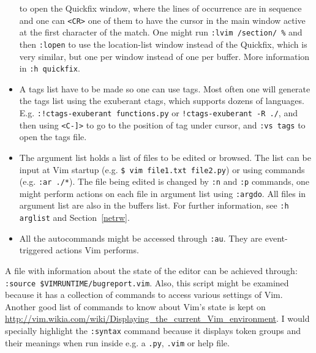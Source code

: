 \documentclass{article}
\newcommand{\ttt}[1] {
	\texttt{<#1>}}
\newcommand{\tttt}[1]{\texttt{#1}}
\begin{document}
\begin{itemize}
		to open the Quickfix window, where the lines of occurrence are in sequence
		and one can \ttt{CR} one of them to have the cursor in the main window active at
		the first character of the match.
		One might run \tttt{:lvim /section/ \%} and then \tttt{:lopen}
		to use the location-list window instead of the Quickfix, which
		is very similar, but one per window instead of one per buffer.
		More information in \tttt{:h quickfix}.
	\item A tags list have to be made so one can use tags.
		Most often one will generate the tags list using the exuberant ctags,
		which supports dozens of languages.
		E.g. \tttt{:!ctags-exuberant functions.py} or \tttt{!ctags-exuberant -R ./},
		and then using \ttt{C-]} to
		go to the position of tag under cursor, and \tttt{:vs tags} to open
		the tags file.
	\item The argument list holds a list of files to be edited or browsed. 
		The list can be input at Vim startup (e.g. \tttt{\$ vim file1.txt file2.py})
	or using commands (e.g. \tttt{:ar ./*}).
		The file being edited is changed by \tttt{:n} and \tttt{:p} commands,
		one might perform actions on each file in argument list using \tttt{:argdo}.
		All files in argument list are also in the buffers list.
    For further information, see \tttt{:h arglist} and Section~\ref{netrw}.
  \item All the autocommands might be accessed through \tttt{:au}.
    They are event-triggered actions Vim performs.
\end{itemize}

A file with information about the state of the editor
can be achieved through: \tttt{:source \$VIMRUNTIME/bugreport.vim}.
Also, this script might be examined because it has
a collection of commands to access various settings of Vim.
Another good list of commands to know about Vim's state is kept on
\url{http://vim.wikia.com/wiki/Displaying_the_current_Vim_environment}.
I would specially highlight the \tttt{:syntax} command because
it displays token groups and their meanings when run
inside e.g. a \tttt{.py}, \tttt{.vim} or help file.
\end{document}
